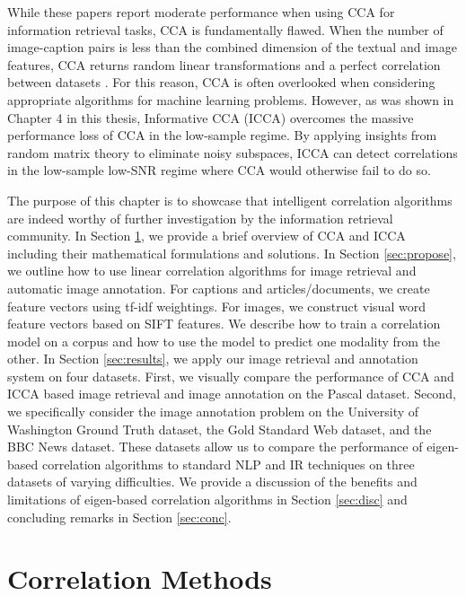 While these papers report moderate performance when using CCA for information retrieval
tasks, CCA is fundamentally flawed. When the number of image-caption pairs is less
than the combined dimension of the textual and image features, CCA returns random linear
transformations and a perfect correlation between datasets
\cite{pezeshki2004empirical}. For this reason, CCA is often overlooked when considering
appropriate algorithms for machine learning problems. However, as was shown in Chapter 4
in this thesis, Informative CCA (ICCA) overcomes the massive performance loss of
CCA in the low-sample regime. By applying insights from random matrix theory to eliminate
noisy subspaces, ICCA can detect correlations in the low-sample low-SNR regime where CCA
would otherwise fail to do so. 

The purpose of this chapter is to showcase that intelligent correlation algorithms are
indeed worthy of further investigation by the information retrieval community. In Section
\ref{sec:cca}, we provide a brief overview of CCA and ICCA including their mathematical
formulations and solutions. In Section \ref{sec:propose}, we outline how to use linear
correlation algorithms for image retrieval and automatic image annotation. For captions
and articles/documents, we create feature vectors using tf-idf weightings. For images, we
construct visual word feature vectors based on SIFT features. We describe how to train a
correlation model on a corpus and how to use the model to predict one modality from the
other. In Section \ref{sec:results}, we apply our image retrieval and annotation system on
four datasets. First, we visually compare the performance of CCA and ICCA based image
retrieval and image annotation on the Pascal dataset. Second, we specifically consider the
image annotation problem on the University of Washington Ground Truth dataset, the Gold
Standard Web dataset, and the BBC News dataset. These datasets allow us to compare the
performance of eigen-based correlation algorithms to standard NLP and IR techniques on
three datasets of varying difficulties. We provide a discussion of the benefits and
limitations of eigen-based correlation algorithms in Section \ref{sec:disc} and concluding
remarks in Section \ref{sec:conc}.

\section{Correlation Methods}\label{sec:cca}

